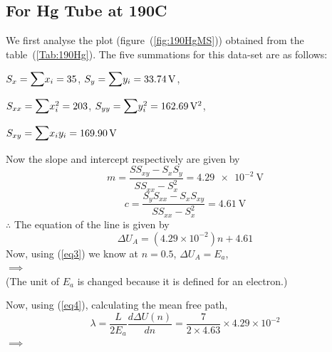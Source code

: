 \documentclass[%
 reprint,
 amsmath,amssymb,
 aps,
]{revtex4-2}
\begin{document}
    \subsection{For Hg Tube at 190\degree C}
        We first analyse the plot (figure~(\ref{fig:190HgMS})) obtained from the table~(\ref{Tab:190Hg}). The five summations for this data-set are as follows:
        \par
        \vspace{0.5cm}
        $S_{x} = \mathlarger{\mathlarger{\sum}} x_{i} = 35$, \hspace{0.5cm} $S_{y} = \mathlarger{\mathlarger{\sum}} y_{i} = \SI{33.74}{\volt}$,
        \par
        \vspace{0.5cm}
        $S_{xx} = \mathlarger{\mathlarger{\sum}} x_{i}^2 = 203$, \hspace{0.5cm} $S_{yy} = \mathlarger{\mathlarger{\sum}} y_{i}^2 = \SI{162.69}{\volt\squared}$,
        \par
        \vspace{0.5cm}
        $S_{xy} = \mathlarger{\mathlarger{\sum}} x_{i}y_{i} = \SI{169.90}{\volt}$
        \par
        \vspace{0.5cm}
        Now the slope and intercept respectively are given by
        \begin{equation}
        \label{eq9}
            m = \dfrac{S S_{xy} - S_{x}S_{y}}{S S_{xx} - S_{x}^2} = \SI{4.29e-2}{\volt}
        \end{equation}
        \begin{equation}
        \label{eq10}
            c = \dfrac{S_{y} S_{xx} - S_{x}S_{xy}}{S S_{xx} - S_{x}^2} = \SI{4.61}{\volt}
        \end{equation}
        $\therefore$ The equation of the line is given by
        \begin{equation}
        \label{eq11}
            \Delta U_A = (4.29 \times 10^{-2})n + 4.61
        \end{equation}
        Now, using (\ref{eq3}) we know at $n = 0.5$, $\Delta U_A = E_a$,\\
        $\implies$  \\
        (The unit of $E_a$ is changed because it is defined for an electron.)
        \par
        Now, using (\ref{eq4}), calculating the mean free path,
        \begin{equation}
        \label{eq12}
            \lambda = \frac{L}{2 E_a} \frac{d \Delta U(n)}{dn} = \dfrac{7}{2 \times 4.63} \times 4.29 \times 10^{-2}
        \end{equation}
        $\implies$ 
\end{document}
